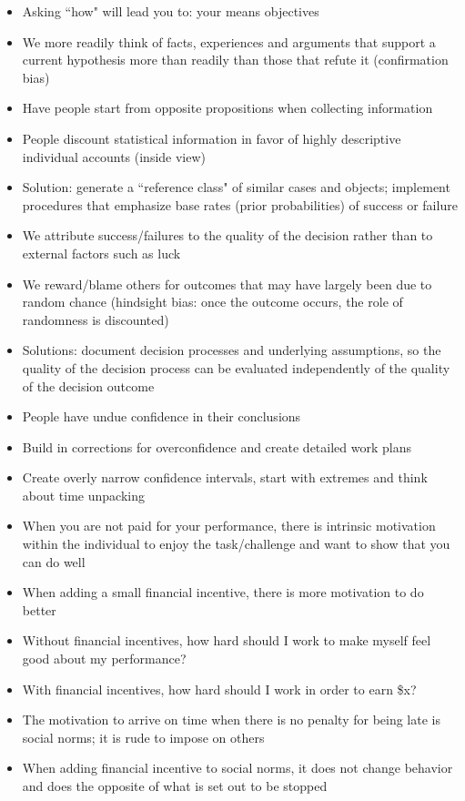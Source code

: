 \documentclass[12pt]{article}
\begin{document}
\begin{itemize}
\item Asking ``how" will lead you to: your means objectives 
\item We more readily think of facts, experiences and arguments that support a current hypothesis more than readily than those that refute it (confirmation bias) 
\item Have people start from opposite propositions when collecting information 
\item People discount statistical information in favor of highly descriptive individual accounts (inside view) 
\item Solution: generate a ``reference class" of similar cases and objects; implement procedures that emphasize base rates (prior probabilities) of success or failure 
\item We attribute success/failures to the quality of the decision rather than to external factors such as luck 
\item We reward/blame others for outcomes that may have largely been due to random chance (hindsight bias: once the outcome occurs, the role of randomness is discounted) 
\item Solutions: document decision processes and underlying assumptions, so the quality of the decision process can be evaluated independently of the quality of the decision outcome 
\item People have undue confidence in their conclusions 
\item Build in corrections for overconfidence and create detailed work plans 
\item Create overly narrow confidence intervals, start with extremes and think about time unpacking 
\item When you are not paid for your performance, there is intrinsic motivation within the individual to enjoy the task/challenge and want to show that you can do well 
\item When adding a small financial incentive, there is more motivation to do better 
\item Without financial incentives, how hard should I work to make myself feel good about my performance? 
\item With financial incentives, how hard should I work in order to earn \$x? 
\item The motivation to arrive on time when there is no penalty for being late is social norms; it is rude to impose on others 
\item When adding financial incentive to social norms, it does not change behavior and does the opposite of what is set out to be stopped 

\end{itemize}
\end{document}
